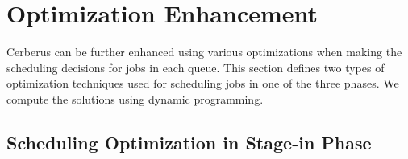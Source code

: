 % 


\section{Optimization Enhancement}
\label{Sec:Opt}

Cerberus can be further enhanced using various optimizations
when making the scheduling decisions for jobs in each queue.
This section defines two types of optimization techniques used for scheduling jobs in one of the three phases.
We compute the solutions using dynamic programming.

\subsection{Scheduling Optimization in Stage-in Phase}

